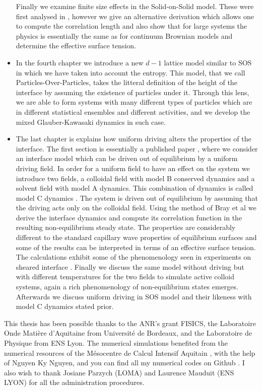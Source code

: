 \begin{itemize}
    Finally we examine finite size effects in the Solid-on-Solid model. These were first analysed in \cite{privman_finite-size_1988-1}, however we give an alternative derivation which allows one to compute the correlation length and also show that for large systems the physics is essentially the same as for continuum Brownian models and determine the effective surface tension.
    \item In the fourth chapter we introduce a new $d-1$ lattice model similar to SOS in which we have taken into account the entropy. This model, that we call Particles-Over-Particles, takes the litteral definition of the height of the interface by assuming the existence of particles under it. Through this lens, we are able to form systems with many different types of particles which are in different statistical ensembles and different activities, and we develop the mixed Glauber-Kawasaki dynamics in such case.
   
    \item The last chapter is explains how uniform driving alters the properties of the interface. The first section is essentially a published paper \cite{dean_effect_2020}, where we consider an interface model which can be driven out of equilibrium by a uniform driving field. In order for a uniform field to have an effect on the system we introduce two fields, a colloidal field with model B conserved dynamics and a solvent field with model A dynamics. This combination of dynamics is called model C dynamics \cite{hohenberg_theory_1977}. The system is driven out of equilibrium by assuming that the driving acts only on the colloidal field. Using the method of Bray et al \cite{bray_interface_2001} we derive the interface dynamics and compute its correlation function in the resulting non-equilibrium steady state. The properties are considerably different to the standard capillary wave properties of equilibrium surfaces and some of the results can be interpreted in terms of an effective surface tension. The calculations exhibit some of the phenomenology seen in experiments on sheared interface \cite{derks_suppression_2006}. Finally we discuss the same model without driving but with different temperatures for the two fields to simulate active colloid systems, again a rich phenomenology of non-equilibrium states emerges.
    Afterwards we discuss uniform driving in SOS model and their likeness with model C dynamics stated prior.

\end{itemize}

This thesis has been possible thanks to the ANR's grant FISICS, the Laboratoire Onde Matière d'Aquitaine from Université de Bordeaux, and the Laboratoire de Physique  from ENS Lyon. The numerical simulations benefited from the numerical resources of the Mésocentre de Calcul Intensif Aquitain \cite{noauthor_mesocentre_nodate}, with the help of Nguyen Ky Nguyen, and you can find all my numerical codes on Github \cite{paul_gersberg_github_2020}. I also wish to thank Josiane Parzych (LOMA) and Laurence Mauduit (ENS LYON) for all the administration procedures.
